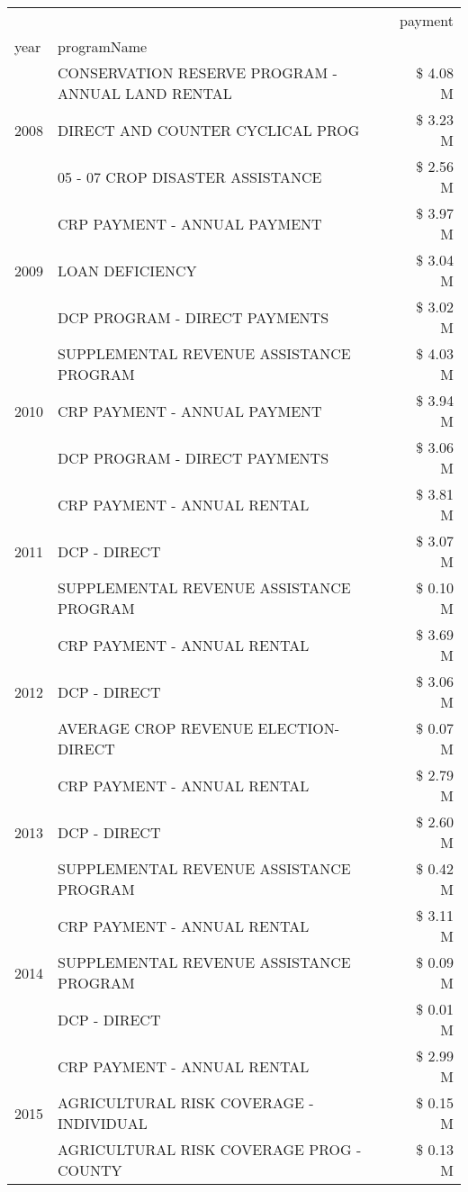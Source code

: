 \begin{tabular}{llr}
\toprule
 &  & payment \\
year & programName &  \\
\midrule
\multirow[t]{3}{*}{2008} & CONSERVATION RESERVE PROGRAM - ANNUAL LAND RENTAL & \$ 4.08 M \\
 & DIRECT AND COUNTER CYCLICAL PROG & \$ 3.23 M \\
 & 05 - 07 CROP DISASTER ASSISTANCE & \$ 2.56 M \\
\cline{1-3}
\multirow[t]{3}{*}{2009} & CRP PAYMENT - ANNUAL PAYMENT & \$ 3.97 M \\
 & LOAN DEFICIENCY & \$ 3.04 M \\
 & DCP PROGRAM - DIRECT PAYMENTS & \$ 3.02 M \\
\cline{1-3}
\multirow[t]{3}{*}{2010} & SUPPLEMENTAL REVENUE ASSISTANCE PROGRAM & \$ 4.03 M \\
 & CRP PAYMENT - ANNUAL PAYMENT & \$ 3.94 M \\
 & DCP PROGRAM - DIRECT PAYMENTS & \$ 3.06 M \\
\cline{1-3}
\multirow[t]{3}{*}{2011} & CRP PAYMENT - ANNUAL RENTAL & \$ 3.81 M \\
 & DCP - DIRECT & \$ 3.07 M \\
 & SUPPLEMENTAL REVENUE ASSISTANCE PROGRAM & \$ 0.10 M \\
\cline{1-3}
\multirow[t]{3}{*}{2012} & CRP PAYMENT - ANNUAL RENTAL & \$ 3.69 M \\
 & DCP - DIRECT & \$ 3.06 M \\
 & AVERAGE CROP REVENUE ELECTION-DIRECT & \$ 0.07 M \\
\cline{1-3}
\multirow[t]{3}{*}{2013} & CRP PAYMENT - ANNUAL RENTAL & \$ 2.79 M \\
 & DCP - DIRECT & \$ 2.60 M \\
 & SUPPLEMENTAL REVENUE ASSISTANCE PROGRAM & \$ 0.42 M \\
\cline{1-3}
\multirow[t]{3}{*}{2014} & CRP PAYMENT - ANNUAL RENTAL & \$ 3.11 M \\
 & SUPPLEMENTAL REVENUE ASSISTANCE PROGRAM & \$ 0.09 M \\
 & DCP - DIRECT & \$ 0.01 M \\
\cline{1-3}
\multirow[t]{3}{*}{2015} & CRP PAYMENT - ANNUAL RENTAL & \$ 2.99 M \\
 & AGRICULTURAL RISK COVERAGE - INDIVIDUAL & \$ 0.15 M \\
 & AGRICULTURAL RISK COVERAGE PROG - COUNTY & \$ 0.13 M \\
\cline{1-3}

\end{tabular}
